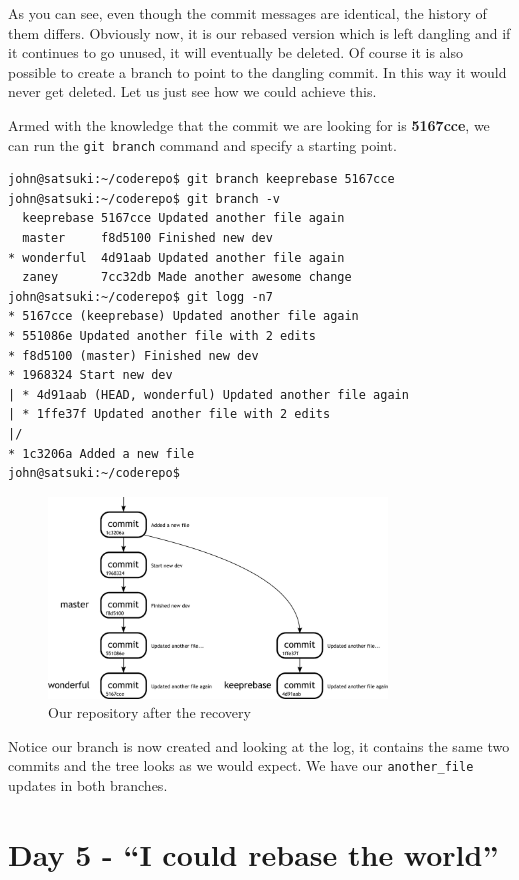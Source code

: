 As you can see, even though the commit messages are identical, the history of them differs.  Obviously now, it is our rebased version which is left dangling and if it continues to go unused, it will eventually be deleted.  Of course it is also possible to create a branch to point to the dangling commit.  In this way it would never get deleted.  Let us just see how we could achieve this.

Armed with the knowledge that the commit we are looking for is \textbf{5167cce}, we can run the \texttt{git branch} command and specify a starting point.

\begin{Verbatim}
john@satsuki:~/coderepo$ git branch keeprebase 5167cce
john@satsuki:~/coderepo$ git branch -v
  keeprebase 5167cce Updated another file again
  master     f8d5100 Finished new dev
* wonderful  4d91aab Updated another file again
  zaney      7cc32db Made another awesome change
john@satsuki:~/coderepo$ git logg -n7
* 5167cce (keeprebase) Updated another file again
* 551086e Updated another file with 2 edits
* f8d5100 (master) Finished new dev
* 1968324 Start new dev
| * 4d91aab (HEAD, wonderful) Updated another file again
| * 1ffe37f Updated another file with 2 edits
|/  
* 1c3206a Added a new file
john@satsuki:~/coderepo$ 
\end{Verbatim}

\begin{figure}[hbt]
\centering
\includegraphics[width=9cm]{images/f-w7-d7.pdf}
\caption{Our repository after the recovery}
\end{figure}

Notice our branch is now created and looking at the log, it contains the same two commits and the tree looks as we would expect.  We have our \texttt{another\_file} updates in both branches.

\section{Day 5 - ``I could rebase the world''}
